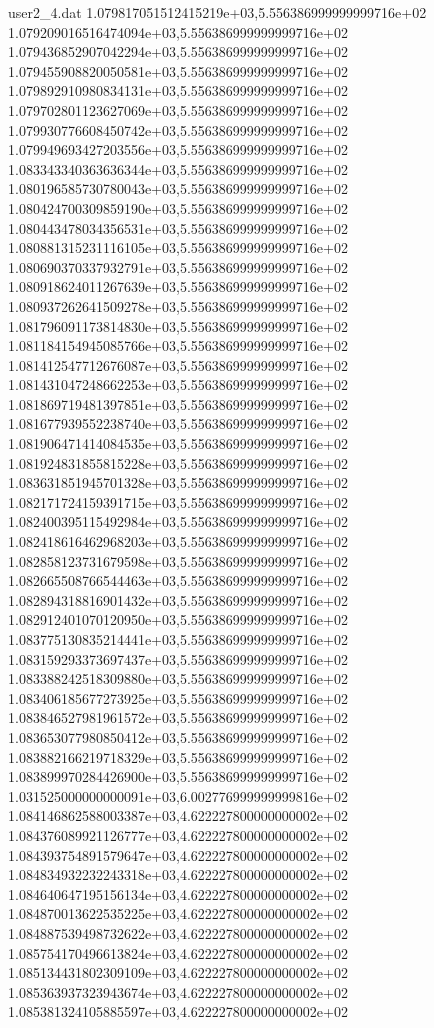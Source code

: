 \begin{filecontents}{user2_4.dat}
1.079817051512415219e+03,5.556386999999999716e+02
1.079209016516474094e+03,5.556386999999999716e+02
1.079436852907042294e+03,5.556386999999999716e+02
1.079455908820050581e+03,5.556386999999999716e+02
1.079892910980834131e+03,5.556386999999999716e+02
1.079702801123627069e+03,5.556386999999999716e+02
1.079930776608450742e+03,5.556386999999999716e+02
1.079949693427203556e+03,5.556386999999999716e+02
1.083343340363636344e+03,5.556386999999999716e+02
1.080196585730780043e+03,5.556386999999999716e+02
1.080424700309859190e+03,5.556386999999999716e+02
1.080443478034356531e+03,5.556386999999999716e+02
1.080881315231116105e+03,5.556386999999999716e+02
1.080690370337932791e+03,5.556386999999999716e+02
1.080918624011267639e+03,5.556386999999999716e+02
1.080937262641509278e+03,5.556386999999999716e+02
1.081796091173814830e+03,5.556386999999999716e+02
1.081184154945085766e+03,5.556386999999999716e+02
1.081412547712676087e+03,5.556386999999999716e+02
1.081431047248662253e+03,5.556386999999999716e+02
1.081869719481397851e+03,5.556386999999999716e+02
1.081677939552238740e+03,5.556386999999999716e+02
1.081906471414084535e+03,5.556386999999999716e+02
1.081924831855815228e+03,5.556386999999999716e+02
1.083631851945701328e+03,5.556386999999999716e+02
1.082171724159391715e+03,5.556386999999999716e+02
1.082400395115492984e+03,5.556386999999999716e+02
1.082418616462968203e+03,5.556386999999999716e+02
1.082858123731679598e+03,5.556386999999999716e+02
1.082665508766544463e+03,5.556386999999999716e+02
1.082894318816901432e+03,5.556386999999999716e+02
1.082912401070120950e+03,5.556386999999999716e+02
1.083775130835214441e+03,5.556386999999999716e+02
1.083159293373697437e+03,5.556386999999999716e+02
1.083388242518309880e+03,5.556386999999999716e+02
1.083406185677273925e+03,5.556386999999999716e+02
1.083846527981961572e+03,5.556386999999999716e+02
1.083653077980850412e+03,5.556386999999999716e+02
1.083882166219718329e+03,5.556386999999999716e+02
1.083899970284426900e+03,5.556386999999999716e+02
1.031525000000000091e+03,6.002776999999999816e+02
1.084146862588003387e+03,4.622227800000000002e+02
1.084376089921126777e+03,4.622227800000000002e+02
1.084393754891579647e+03,4.622227800000000002e+02
1.084834932232243318e+03,4.622227800000000002e+02
1.084640647195156134e+03,4.622227800000000002e+02
1.084870013622535225e+03,4.622227800000000002e+02
1.084887539498732622e+03,4.622227800000000002e+02
1.085754170496613824e+03,4.622227800000000002e+02
1.085134431802309109e+03,4.622227800000000002e+02
1.085363937323943674e+03,4.622227800000000002e+02
1.085381324105885597e+03,4.622227800000000002e+02

\end{filecontents}
